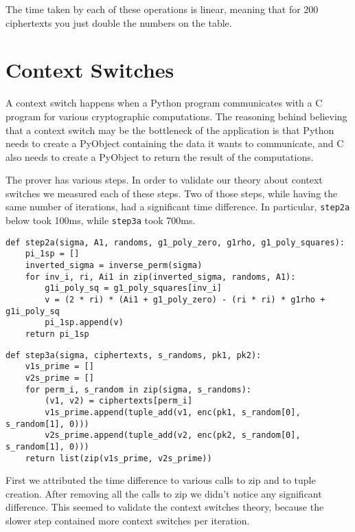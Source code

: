 \documentclass{article}
\begin{document}
The time taken by each of these operations is linear, meaning that for
200 ciphertexts you just double the numbers on the table.

\section{Context Switches}

A context switch happens when a Python program communicates with a C
program for various cryptographic computations. The reasoning behind
believing that a context switch may be the bottleneck of the application
is that Python needs to create a PyObject containing the
data it wants to communicate, and C also needs to create a PyObject to
return the result of the computations.

The prover has various steps. In order to validate our theory about
context switches we measured each of these steps. Two of those steps,
while having the same number of iterations, had a significant time
difference. In particular, \texttt{step2a} below took
100ms, while \texttt{step3a} took 700ms.

\begin{verbatim}
def step2a(sigma, A1, randoms, g1_poly_zero, g1rho, g1_poly_squares):
    pi_1sp = []
    inverted_sigma = inverse_perm(sigma)
    for inv_i, ri, Ai1 in zip(inverted_sigma, randoms, A1):
        g1i_poly_sq = g1_poly_squares[inv_i]
        v = (2 * ri) * (Ai1 + g1_poly_zero) - (ri * ri) * g1rho + g1i_poly_sq
        pi_1sp.append(v)
    return pi_1sp
  \end{verbatim}

\begin{verbatim}
def step3a(sigma, ciphertexts, s_randoms, pk1, pk2):
    v1s_prime = []
    v2s_prime = []
    for perm_i, s_random in zip(sigma, s_randoms):
        (v1, v2) = ciphertexts[perm_i]
        v1s_prime.append(tuple_add(v1, enc(pk1, s_random[0], s_random[1], 0)))
        v2s_prime.append(tuple_add(v2, enc(pk2, s_random[0], s_random[1], 0)))
    return list(zip(v1s_prime, v2s_prime))
\end{verbatim}
  
\noindent
First we attributed the time difference to various calls to zip and to tuple
creation. After removing all the calls to zip we didn't notice any significant
difference. This seemed to validate the context switches theory, because the
slower step contained more context switches per iteration.
\end{document}
